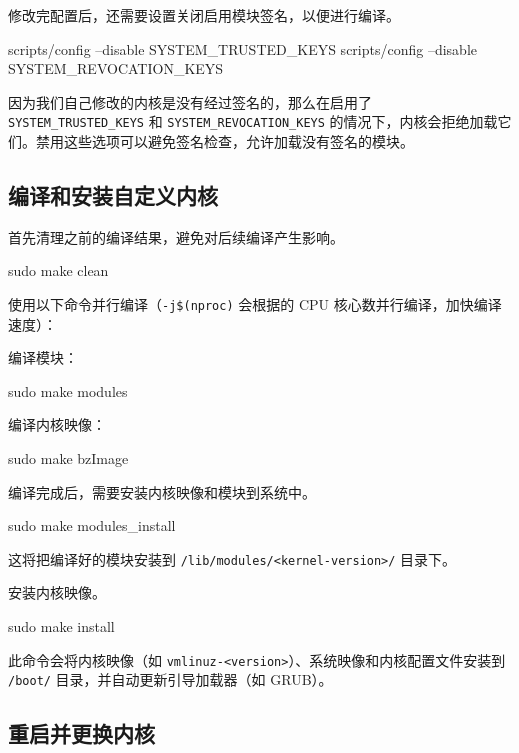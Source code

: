 修改完配置后，还需要设置关闭启用模块签名，以便进行编译。
\begin{bashcode}
    scripts/config --disable SYSTEM_TRUSTED_KEYS
    scripts/config --disable SYSTEM_REVOCATION_KEYS
\end{bashcode}
因为我们自己修改的内核是没有经过签名的，那么在启用了 \texttt{SYSTEM\_TRUSTED\_KEYS} 和 \texttt{SYSTEM\_REVOCATION\_KEYS} 的情况下，内核会拒绝加载它们。禁用这些选项可以避免签名检查，允许加载没有签名的模块。

\subsection{编译和安装自定义内核}

首先清理之前的编译结果，避免对后续编译产生影响。
\begin{bashcode}
    sudo make clean
\end{bashcode}

使用以下命令并行编译（\texttt{-j\$(nproc)} 会根据的 CPU 核心数并行编译，加快编译速度）：

编译模块：
\begin{bashcode}
    sudo make modules
\end{bashcode}

编译内核映像：
\begin{bashcode}
    sudo make bzImage
\end{bashcode}

编译完成后，需要安装内核映像和模块到系统中。
\begin{bashcode}
    sudo make modules_install
\end{bashcode}
这将把编译好的模块安装到 \texttt{/lib/modules/<kernel-version>/} 目录下。

安装内核映像。
\begin{bashcode}
    sudo make install
\end{bashcode}
此命令会将内核映像（如 \texttt{vmlinuz-<version>}）、系统映像和内核配置文件安装到 \texttt{/boot/} 目录，并自动更新引导加载器（如 GRUB）。

\subsection{重启并更换内核}

